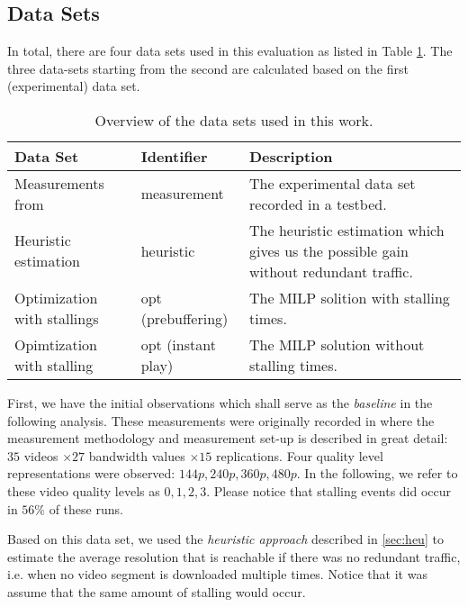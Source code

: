 
\subsection{Data Sets}
\label{sec:datasets}

In total, there are four data sets used in this evaluation as listed in Table \ref{tab:datasets}. The three data-sets starting from the second are calculated based on the first (experimental) data set.
\begin{table}
\caption{Overview of the data sets used in this work.}
\label{tab:datasets}
\centering
\begin{tabular}{p{2cm}p{2.3cm}p{3.2cm}}
\toprule
Data Set & Identifier & Description \\ 
\midrule 
Measurements from \cite{sieber16sacrificing} & measurement & The experimental data set recorded in a testbed. \\ 
\addlinespace
Heuristic estimation & heuristic & The heuristic estimation which gives us the possible gain without redundant traffic. \\ 
\addlinespace
Optimization with stallings & opt (prebuffering) & The MILP solition with stalling times. \\ 
\addlinespace
Opimtization with stalling & opt (instant play) & The MILP solution without stalling times. \\ 
\bottomrule
\end{tabular} 
\end{table}

First, we have the initial observations which shall serve as the \textit{baseline} in the following analysis. These measurements were originally recorded in \cite{sieber16sacrificing} where the measurement methodology and measurement set-up is described in great detail: $35$ videos $\times 27$ bandwidth values $\times 15$ replications. Four quality level representations were observed: $144p, 240p, 360p, 480p$. In the following, we refer to these video quality levels as $0,1,2,3$. Please notice that stalling events did occur in $56\%$ of these runs.

Based on this data set, we used the \textit{heuristic approach} described in \ref{sec:heu} to estimate the average resolution that is reachable if there was no redundant traffic, i.e. when no video segment is downloaded multiple times. Notice that it was assume that the same amount of stalling would occur.

